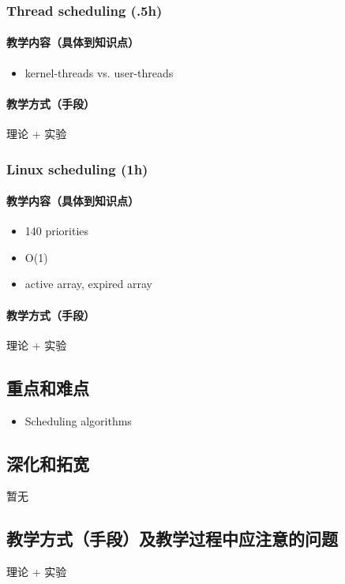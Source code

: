 \documentclass[11pt]{article}
\begin{document}
\subsubsection{Thread scheduling (.5h)}
\label{sec-4-2-3}
\paragraph{教学内容（具体到知识点）}
\label{sec-4-2-3-1}
\begin{itemize}
\item kernel-threads vs. user-threads
\end{itemize}
\paragraph{教学方式（手段）}
\label{sec-4-2-3-2}
理论 + 实验
\subsubsection{Linux scheduling (1h)}
\label{sec-4-2-4}
\paragraph{教学内容（具体到知识点）}
\label{sec-4-2-4-1}
\begin{itemize}
\item 140 priorities
\item O(1)
\item active array, expired array
\end{itemize}
\paragraph{教学方式（手段）}
\label{sec-4-2-4-2}
理论 + 实验
\subsection{重点和难点}
\label{sec-4-3}
\begin{itemize}
\item Scheduling algorithms
\end{itemize}
\subsection{深化和拓宽}
\label{sec-4-4}
暂无
\subsection{教学方式（手段）及教学过程中应注意的问题}
\label{sec-4-5}
理论 + 实验
\end{document}

